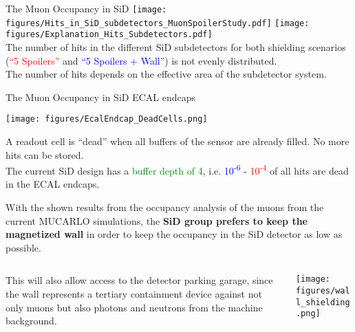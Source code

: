 \documentclass[xcolor={dvipsnames}]{beamer}
\begin{document}
\begin{frame}{The Muon Occupancy in SiD}
 \texttt{[image: figures/Hits\_in\_SiD\_subdetectors\_MuonSpoilerStudy.pdf]}
  \texttt{[image: figures/Explanation\_Hits\_Subdetectors.pdf]}\\
The number of hits in the different SiD subdetectors for both shielding scenarios (\textcolor{Red}{``5 Spoilers''} and \textcolor{Blue}{``5 Spoilers + Wall''}) is not evenly distributed.\\
The number of hits depends on the effective area of the subdetector system.
 \end{frame}
 
\begin{frame}{The Muon Occupancy in SiD ECAL endcaps}
\begin{center}
  \texttt{[image: figures/EcalEndcap\_DeadCells.png]}
\end{center}
{\small A readout cell is ``dead'' when all buffers of the sensor are already filled. No more hits can be stored.}\\
The current SiD design has a \textcolor{Green}{buffer depth of 4}, i.e. \textcolor{Blue}{10\textsuperscript{-6}} - \textcolor{Red}{10\textsuperscript{-4}} of all hits are dead in the ECAL endcaps.
\end{frame}
\begin{frame}
 With the shown results from the occupancy analysis of the muons from the current MUCARLO simulations, the \textbf{SiD group prefers to keep the magnetized wall} in order to keep the occupancy in the SiD detector as low as possible.
 \begin{columns}
  \begin{column}{0.4\textwidth}
    This will also allow access to the detector parking garage, since the wall represents a tertiary containment device against not only muons but also photons and neutrons from the machine background.
  \end{column}
  \begin{column}{0.6\textwidth}
    \texttt{[image: figures/wall\_shielding.png]}
  \end{column}
 \end{columns}
\end{frame}
\end{document}
